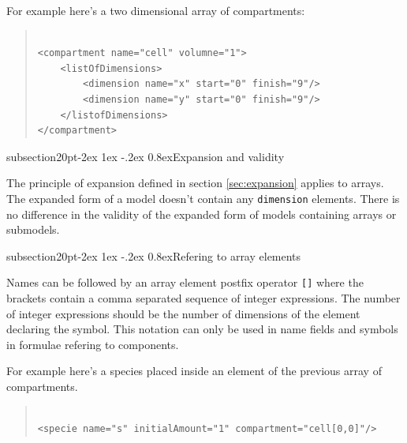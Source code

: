 \documentclass[10pt]{article}
\makeatletter
\renewcommand{\subsection}{\@startsection%
  {subsection}{2}{0pt}{-2ex \@plus 1ex \@minus -.2ex}%
  {0.8ex}{\slshape\large\bfseries\sffamily}}
\newcommand{\tightspacing}{\renewcommand{\baselinestretch}{0.85}}
\newcommand{\regularspacing}{\renewcommand{\baselinestretch}{1.0}}
\newcommand{\class}[1]{\texttt{#1}}
\makeatother
\begin{document}
For example here's a two dimensional array of compartments:

\begin{quote}
  \begin{small}
    \tightspacing

\begin{verbatim}

<compartment name="cell" volumne="1">
    <listOfDimensions>
        <dimension name="x" start="0" finish="9"/>
        <dimension name="y" start="0" finish="9"/>
    </listofDimensions>
</compartment>

\end{verbatim}

    \regularspacing
  \end{small}
\end{quote}

\subsection{Expansion and validity}

The principle of expansion defined in section \ref{sec:expansion} applies to
arrays.  The expanded form of a model doesn't contain any \class{dimension} elements.
There is no difference in the validity of the expanded form of models containing
arrays or submodels.

\subsection{Refering to array elements}

Names can be followed by an array element postfix operator \verb+[]+ where the brackets contain a comma
separated sequence of integer expressions. The number of integer
expressions should be the number of dimensions of the element
declaring the symbol. This notation can only be used in name
fields and symbols in formulae refering to components.

For example here's a species placed inside
an element of the previous array of compartments.

\begin{quote}
  \begin{small}
    \tightspacing

\begin{verbatim}

<specie name="s" initialAmount="1" compartment="cell[0,0]"/>
\end{verbatim}

    \regularspacing
  \end{small}
\end{quote}
\end{document}
